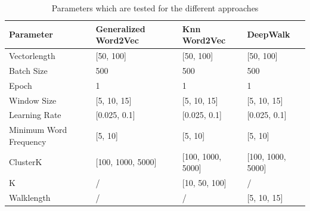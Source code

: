 \begin{table}[!htb]
\centering

\label{tab:parameters}
\begin{tabular}{llll}
\hline
Parameter                                    & Generalized Word2Vec  & Knn Word2Vec          & DeepWalk              \\ \hline
\multicolumn{1}{l|}{Vectorlength}            & {[}50, 100{]}         & {[}50, 100{]}         & {[}50, 100{]}         \\
\multicolumn{1}{l|}{Batch Size}              & 500                   & 500                   & 500                   \\
\multicolumn{1}{l|}{Epoch}                   & 1                     & 1                     & 1                     \\
\multicolumn{1}{l|}{Window Size}             & {[}5, 10, 15{]}       & {[}5, 10, 15{]}       & {[}5, 10, 15{]}       \\
\multicolumn{1}{l|}{Learning Rate}           & {[}0.025, 0.1{]}      & {[}0.025, 0.1{]}      & {[}0.025, 0.1{]}      \\
\multicolumn{1}{l|}{Minimum Word Frequency} & {[}5, 10{]}           & {[}5, 10{]}           & {[}5, 10{]}           \\
\multicolumn{1}{l|}{ClusterK}                & {[}100, 1000, 5000{]} & {[}100, 1000, 5000{]} & {[}100, 1000, 5000{]} \\
\multicolumn{1}{l|}{K}                       & /                     & {[}10, 50, 100{]}     & /                     \\
\multicolumn{1}{l|}{Walklength}              & /                     & /                     & {[}5, 10, 15{]}      
\end{tabular}

\caption{Parameters which are tested for the different approaches}
\end{table}

